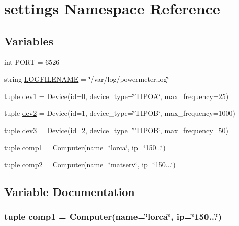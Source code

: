 \hypertarget{namespacesettings}{\section{settings \-Namespace \-Reference}
\label{namespacesettings}
}
\subsection*{\-Variables}
\begin{DoxyCompactItemize}
\item 
int \hyperlink{namespacesettings_a78dc8eaa9905715367e9beb76bf4b5f7}{\-P\-O\-R\-T} = 6526
\item 
string \hyperlink{namespacesettings_ad8b24d8c3b310fdb6f379762c51c07dc}{\-L\-O\-G\-F\-I\-L\-E\-N\-A\-M\-E} = \char`\"{}/var/log/powermeter.\-log\char`\"{}
\item 
tuple \hyperlink{namespacesettings_a17246a9350ea91be0adf6e1f8530a79a}{dev1} = \-Device(id=0, device\-\_\-type=\char`\"{}\-T\-I\-P\-O\-A\char`\"{}, max\-\_\-frequency=25)
\item 
tuple \hyperlink{namespacesettings_a0682f4af7dbee49671213fabc04fa423}{dev2} = \-Device(id=1, device\-\_\-type=\char`\"{}\-T\-I\-P\-O\-B\char`\"{}, max\-\_\-frequency=1000)
\item 
tuple \hyperlink{namespacesettings_a07550322da8c1eb288349a016ca2fcea}{dev3} = \-Device(id=2, device\-\_\-type=\char`\"{}\-T\-I\-P\-O\-B\char`\"{}, max\-\_\-frequency=50)
\item 
tuple \hyperlink{namespacesettings_aef18c5f94185f16c2d504ebde295d3a7}{comp1} = \-Computer(name=\char`\"{}lorca\char`\"{}, ip=\char`\"{}150...\char`\"{})
\item 
tuple \hyperlink{namespacesettings_afd4ef241a1a3e04a2fff8533e79fb803}{comp2} = \-Computer(name=\char`\"{}matserv\char`\"{}, ip=\char`\"{}150...\char`\"{})
\end{DoxyCompactItemize}


\subsection{\-Variable \-Documentation}
\hypertarget{namespacesettings_aef18c5f94185f16c2d504ebde295d3a7}{
\subsubsection[{comp1}]{\setlength{\rightskip}{0pt plus 5cm}tuple {\bf comp1} = \-Computer(name=\char`\"{}lorca\char`\"{}, ip=\char`\"{}150...\char`\"{})}}\label{namespacesettings_aef18c5f94185f16c2d504ebde295d3a7}


